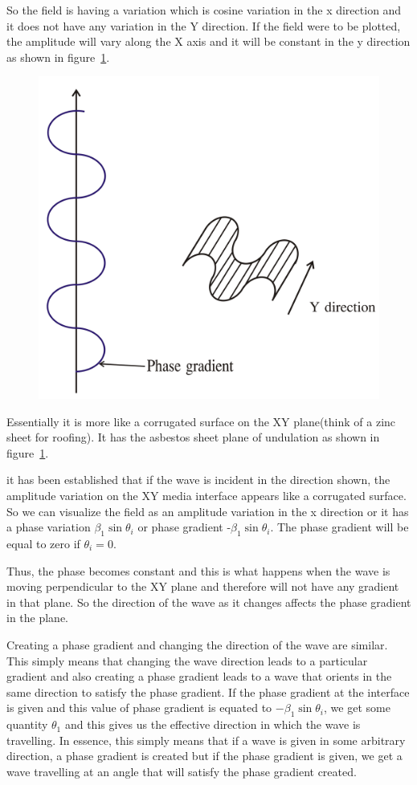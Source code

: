 So the field is having a variation which is cosine variation in the x direction and it does not have any variation in the Y direction. If the field were to be plotted, the amplitude will vary along the X axis and it will be constant in the y direction as shown in figure~\ref{fig:group30c}.
\begin{figure}[h]
\centering
\includegraphics[width=.7\linewidth]{./graphics/group30c}
\caption{}
\label{fig:group30c}
\end{figure}

Essentially it is more like a corrugated surface on the XY plane(think of a zinc sheet for roofing). It has the asbestos sheet plane of undulation as shown in figure~\ref{fig:group30c}.

it has been established that if the wave is incident in the direction shown, the amplitude variation on the XY media interface appears like a corrugated surface. So we can visualize the field as an amplitude variation in the x direction or it has a phase variation $\beta_1\sin \theta_i$ or phase gradient -$\beta_1\sin\theta_i$. The phase gradient will be equal to zero if $\theta_i=0$.

Thus, the phase becomes constant and this is what happens when the wave is moving perpendicular to the XY plane and therefore will not have any gradient in that plane. So the direction of the wave as it changes affects the phase gradient in the plane.

Creating a phase gradient and changing the direction of the wave are similar. This simply means that changing the wave direction leads to a particular gradient and also creating a phase gradient leads to a wave that orients in the same direction to satisfy the phase gradient. If the phase gradient at the interface is given and this value of phase gradient is equated to $-\beta_1 \sin \theta_i$, we get some quantity $\theta_1$ and this gives us the effective direction in which the wave is travelling. In essence, this simply means that if a wave is given in some arbitrary direction, a phase gradient is created but if the phase gradient is given, we get a wave travelling at an angle that will satisfy the phase gradient created.


